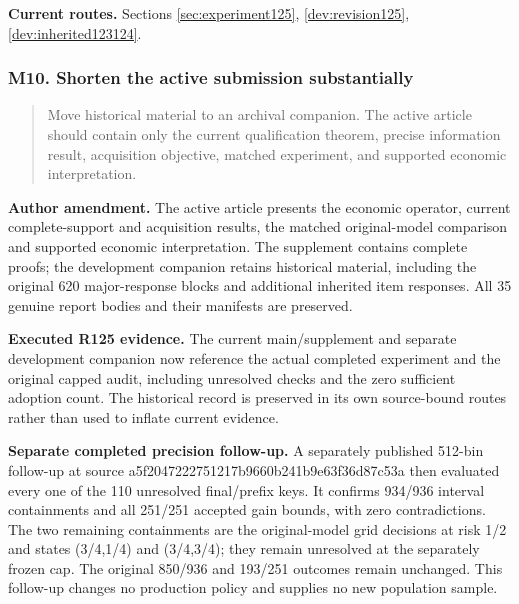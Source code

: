 \noindent\textbf{Current routes.} Sections \ref{sec:experiment125}, \ref{dev:revision125}, \ref{dev:inherited123124}.

\subsubsection{M10. Shorten the active submission substantially}

\begin{quote}\small
Move historical material to an archival companion. The active article should contain only the current qualification theorem, precise information result, acquisition objective, matched experiment, and supported economic interpretation.
\end{quote}

\noindent\textbf{Author amendment.} The active article presents the economic operator, current complete-support and acquisition results, the matched original-model comparison and supported economic interpretation. The supplement contains complete proofs; the development companion retains historical material, including the original 620 major-response blocks and additional inherited item responses. All 35 genuine report bodies and their manifests are preserved.

\noindent\textbf{Executed R125 evidence.} The current main/supplement and separate development companion now reference the actual completed experiment and the original capped audit, including unresolved checks and the zero sufficient adoption count. The historical record is preserved in its own source-bound routes rather than used to inflate current evidence.

\noindent\textbf{Separate completed precision follow-up.} A separately published 512-bin follow-up at source a5f2047222751217b9660b241b9e63f36d87c53a then evaluated every one of the 110 unresolved final/prefix keys. It confirms 934/936 interval containments and all 251/251 accepted gain bounds, with zero contradictions. The two remaining containments are the original-model grid decisions at risk 1/2 and states (3/4,1/4) and (3/4,3/4); they remain unresolved at the separately frozen cap. The original 850/936 and 193/251 outcomes remain unchanged. This follow-up changes no production policy and supplies no new population sample.

